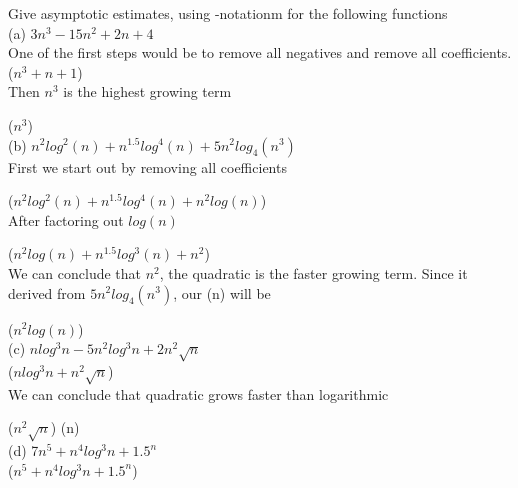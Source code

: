 \documentclass[11pt]{article}
\newcounter{prnum}
\newenvironment{problem}{{\vskip 0.2in\noindent\bf Problem
       \addtocounter{prnum}{1} \arabic{prnum}.}}{\vskip 0.1in}
\begin{document}
\begin{problem}
    Give asymptotic estimates, using \Theta-notationm for the following functions\\
   
    \noindent(a) $3n^3 - 15n^2 + 2n +4$\\

    One of the first steps would be to remove all negatives and remove all coefficients. \\

     \Theta ($n^3 + n + 1$)
     \\

     Then $n^3$ is the highest growing term
     \smallskip

     \Theta($n^3$) \\

   \noindent(b) $n^2 log^2(n) + n^{1.5} log^4 (n) + 5n^2 log_4 (n^3)$  \\

   First we start out by removing all coefficients 
   \smallskip

   \Theta($n^2 log^2(n) + n^{1.5} log^4 (n) + n^2 log(n)$) 
      \\

      After factoring out $log(n)$
      \smallskip

   \Theta($n^2 log(n) + n^{1.5} log^3 (n) + n^2 $)  \\

   We can conclude that $n^2$, the quadratic is the faster growing term.
   Since it derived from $5n^2log_4(n^3)$, our \Theta(n) will be 
   \smallskip

   \Theta($n^2log(n)$) \\



    \noindent(c) $nlog^3n - 5n^2 log^3 n + 2n^2 \sqrt n$  \\

      \Theta ($nlog^3n + n^2 \sqrt n$)
      \\

      We can conclude that quadratic grows faster than logarithmic
      \smallskip

      \Theta($n^2 \sqrt n$) \to \Theta(n) \\

    \noindent(d) 7\cdot $n^5 + n^4 log^3 n + 1.5^n  $ \\

      \Theta($n^5 + n^4 log^3 n + 1.5^n $) 
    \\


\end{problem}
\end{document}
